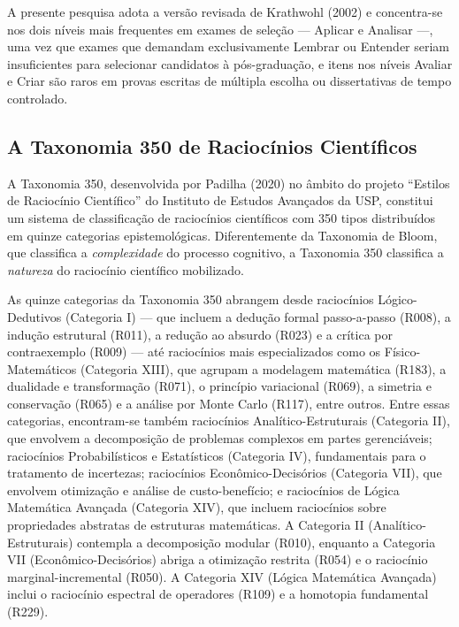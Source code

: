 \documentclass[
  12pt,
  a4paper,
  twoside,
  brazilian
]{article}
\begin{document}
A presente pesquisa adota a versão revisada de Krathwohl (2002) e
concentra-se nos dois níveis mais frequentes em exames de seleção ---
Aplicar e Analisar ---, uma vez que exames que demandam exclusivamente
Lembrar ou Entender seriam insuficientes para selecionar candidatos à
pós-graduação, e itens nos níveis Avaliar e Criar são raros em provas
escritas de múltipla escolha ou dissertativas de tempo controlado.

\subsection{A Taxonomia 350 de Raciocínios
Científicos}\label{a-taxonomia-350-de-raciocuxednios-cientuxedficos}

A Taxonomia 350, desenvolvida por Padilha (2020) no âmbito do projeto
``Estilos de Raciocínio Científico'' do Instituto de Estudos Avançados
da USP, constitui um sistema de classificação de raciocínios científicos
com 350 tipos distribuídos em quinze categorias epistemológicas.
Diferentemente da Taxonomia de Bloom, que classifica a
\emph{complexidade} do processo cognitivo, a Taxonomia 350 classifica a
\emph{natureza} do raciocínio científico mobilizado.

As quinze categorias da Taxonomia 350 abrangem desde raciocínios
Lógico-Dedutivos (Categoria I) --- que incluem a dedução formal
passo-a-passo (R008), a indução estrutural (R011), a redução ao absurdo
(R023) e a crítica por contraexemplo (R009) --- até raciocínios mais
especializados como os Físico-Matemáticos (Categoria XIII), que agrupam
a modelagem matemática (R183), a dualidade e transformação (R071), o
princípio variacional (R069), a simetria e conservação (R065) e a
análise por Monte Carlo (R117), entre outros. Entre essas categorias,
encontram-se também raciocínios Analítico-Estruturais (Categoria II),
que envolvem a decomposição de problemas complexos em partes
gerenciáveis; raciocínios Probabilísticos e Estatísticos (Categoria IV),
fundamentais para o tratamento de incertezas; raciocínios
Econômico-Decisórios (Categoria VII), que envolvem otimização e análise
de custo-benefício; e raciocínios de Lógica Matemática Avançada
(Categoria XIV), que incluem raciocínios sobre propriedades abstratas de
estruturas matemáticas. A Categoria II (Analítico-Estruturais) contempla
a decomposição modular (R010), enquanto a Categoria VII
(Econômico-Decisórios) abriga a otimização restrita (R054) e o
raciocínio marginal-incremental (R050). A Categoria XIV (Lógica
Matemática Avançada) inclui o raciocínio espectral de operadores (R109)
e a homotopia fundamental (R229).
\end{document}
